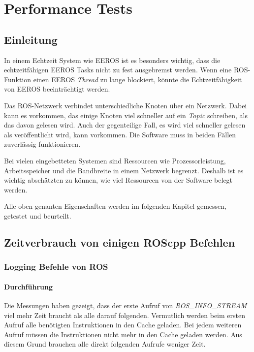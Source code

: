 \chapter{Performance Tests}
\section{Einleitung}
In einem Echtzeit System wie EEROS ist es besonders wichtig, dass die echtzeitfähigen EEROS Tasks nicht zu fest ausgebremst werden.
Wenn eine ROS-Funktion einen EEROS \textit{Thread} zu lange blockiert, könnte die Echtzeitfähigkeit von EEROS beeinträchtigt werden.

Das ROS-Netzwerk verbindet unterschiedliche Knoten über ein Netzwerk.
Dabei kann es vorkommen, das einige Knoten viel schneller auf ein \textit{Topic} schreiben, als das davon gelesen wird.
Auch der gegenteilige Fall, es wird viel schneller gelesen als veröffentlicht wird, kann vorkommen.
Die Software muss in beiden Fällen zuverlässig funktionieren.

Bei vielen eingebetteten Systemen sind Ressourcen wie Prozessorleistung, Arbeitsspeicher und die Bandbreite in einem Netzwerk begrenzt.
Deshalb ist es wichtig abschätzten zu können, wie viel Ressourcen von der Software belegt werden.

Alle oben genanten Eigenschaften werden im folgenden Kapitel gemessen, getestet und beurteilt.


\section{Zeitverbrauch von einigen ROScpp Befehlen}

\subsection{Logging Befehle von ROS}

\subsubsection{Durchführung}
Die Messungen haben gezeigt, dass der erste Aufruf von \textit{ROS\_INFO\_STREAM} viel mehr Zeit braucht als alle darauf folgenden.
Vermutlich werden beim ersten Aufruf alle benötigten Instruktionen in den Cache geladen.
Bei jedem weiteren Aufruf müssen die Instruktionen nicht mehr in den Cache geladen werden.
Aus diesem Grund brauchen alle direkt folgenden Aufrufe weniger Zeit.

